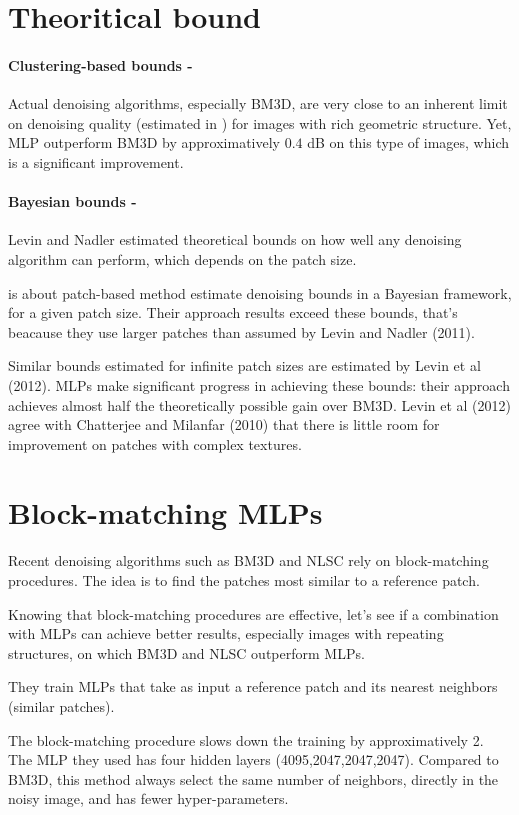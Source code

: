 \documentclass[10pt,a4paper]{article}
\newcommand{\svs}{\vspace{9pt}}
\newcommand{\ourparagraph}[1]{\paragraph{#1}}
\begin{document}
\section{Theoritical bound}

\ourparagraph{Clustering-based bounds -}{Actual denoising algorithms, especially BM3D, are very close to an inherent limit on denoising quality (estimated in \citep{deaddenoise}) for images with rich geometric structure. Yet, MLP outperform BM3D by approximatively $0.4$ dB  on this type of images, which is a significant improvement.

\svs

\ourparagraph{Bayesian bounds -}{Levin and Nadler \citep{Levin2011NaturalID} estimated theoretical bounds on how well any denoising algorithm can perform, which depends on the patch size.


is about patch-based method estimate denoising bounds in a Bayesian framework, for a given patch size. Their approach results exceed these bounds, that's beacause they use larger patches than assumed by Levin and Nadler (2011).

Similar bounds estimated for infinite patch sizes are estimated by Levin et al (2012). MLPs make significant progress in achieving these bounds: their approach achieves almost half the theoretically possible gain over BM3D. Levin et al (2012) agree with Chatterjee and Milanfar (2010) that there is little room for improvement on patches with complex textures.}

\section{Block-matching MLPs}

Recent denoising algorithms such as BM3D and NLSC rely on block-matching procedures. The idea is to find the patches most similar to a reference patch.

Knowing that block-matching procedures are effective, let's see if a combination with MLPs can achieve better results, especially images with repeating structures, on which BM3D and NLSC outperform MLPs.

They train MLPs that take as input a reference patch and its nearest neighbors (similar patches).

The block-matching procedure slows down the training by approximatively 2. The MLP they used has four hidden layers (4095,2047,2047,2047). Compared to BM3D, this method always select the same number of neighbors, directly in the noisy image, and has fewer hyper-parameters.

}
\end{document}
